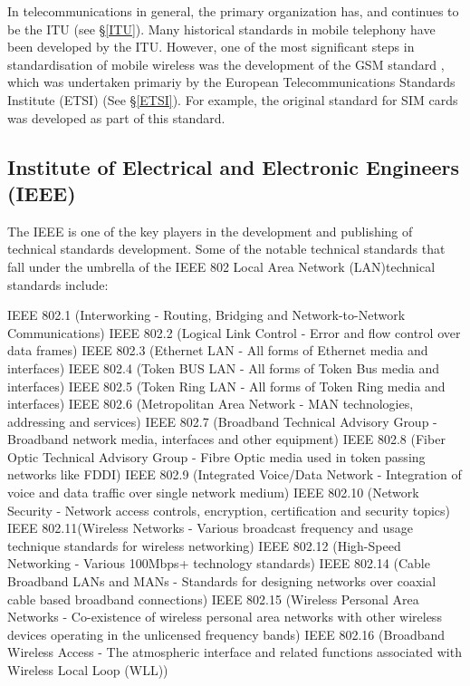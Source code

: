 In telecommunications in general, the primary organization has, and continues
to be the ITU (see \S\ref{ITU}). Many historical standards in mobile
telephony have been developed by the ITU. However, one of the most significant
steps in standardisation of mobile wireless was the
development of the GSM standard \cite{GSM}, which was undertaken primariy by the
European Telecommunications Standards Institute (ETSI) (See \S\ref{ETSI}).
For example, the original standard for SIM cards was developed as part of
this standard.




\subsection{Institute of Electrical and Electronic Engineers (IEEE)}

The IEEE is one of the key players in the development and publishing of technical  standards development. Some of the notable technical standards that fall under the umbrella of the IEEE 802 Local Area Network (LAN)technical standards include:

IEEE 802.1 (Interworking - Routing, Bridging and Network-to-Network Communications)
IEEE 802.2 (Logical Link Control - Error and flow control over data frames) 
IEEE 802.3 (Ethernet LAN - All forms of Ethernet media and interfaces)
IEEE 802.4 (Token BUS LAN - All forms of Token Bus media and interfaces) 
IEEE 802.5 (Token Ring LAN - All forms of Token Ring media and interfaces)
IEEE 802.6 (Metropolitan Area Network - MAN technologies, addressing and services)
IEEE 802.7 (Broadband Technical Advisory Group - Broadband  network media, interfaces and other equipment)
IEEE 802.8 (Fiber Optic Technical Advisory Group - Fibre Optic media used in token passing networks like FDDI)
IEEE 802.9 (Integrated Voice/Data Network - Integration of voice and data traffic over single network medium)
IEEE 802.10 (Network Security - Network access controls, encryption, certification and security topics)
IEEE 802.11(Wireless Networks - Various broadcast frequency and usage technique standards for wireless networking)
IEEE 802.12 (High-Speed Networking - Various 100Mbps+ technology standards)
IEEE 802.14 (Cable Broadband LANs and MANs - Standards for designing networks over coaxial cable based broadband connections)
IEEE 802.15 (Wireless Personal Area Networks - Co-existence of wireless personal area networks with other wireless devices operating in the unlicensed frequency bands)
IEEE 802.16 (Broadband Wireless Access - The atmospheric interface and related functions associated with Wireless Local Loop (WLL)) 


